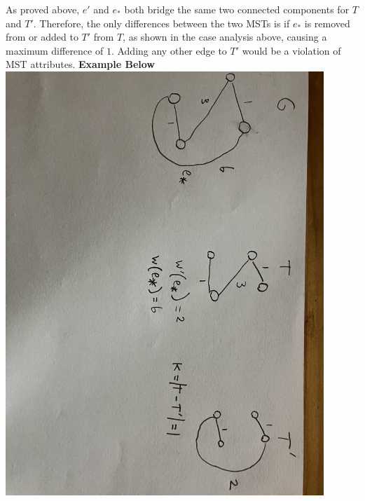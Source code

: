 \documentclass{article}
\begin{document}
As proved above, $e'$ and $e_*$ both bridge the same two connected components for $T$ and $T'$. Therefore, the only differences between the two MSTs is if $e_*$ is removed from or added to $T'$ from $T$, as shown in the case analysis above, causing a maximum difference of $1$. Adding any other edge to $T'$ would be a violation of MST attributes. \newline
\textbf{Example Below} \newline
\newline 
\includegraphics[width=12cm]{IMG_1076}




\end{document}

